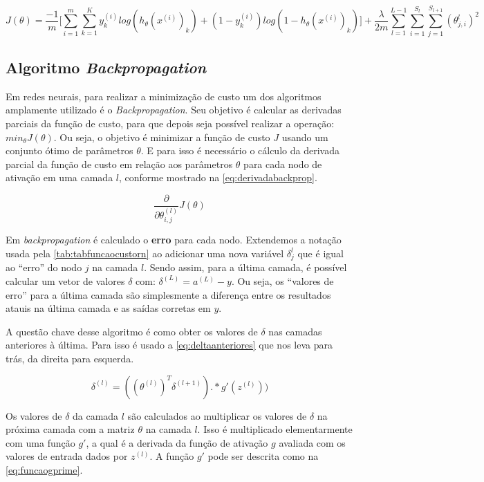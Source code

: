\begin{equation}\label{eq:funcaodecustorn}
J(\theta) = \frac{-1}{m}\Big[ \sum\limits_{i=1}^m \sum\limits_{k=1}^K y_k^{(i)}log(h_{\theta}(x^{(i)})_k) + (1 - y_k^{(i)})log(1 - h_{\theta}(x^{(i)})_k) \Big] +
\frac{\lambda}{2m} 
\sum\limits_{l=1}^{L-1}
\sum\limits_{i=1}^{S_l}
\sum\limits_{j=1}^{S_{l+1}} (\theta_{j,i}^{l})^2
\end{equation}


\subsection{Algoritmo \textit{Backpropagation}}

Em redes neurais, para realizar a minimização de custo um dos algoritmos amplamente utilizado é o \textit{Backpropagation}. Seu objetivo é calcular as derivadas parciais da função de custo, para que depois seja possível realizar a operação: $min_{\theta}J(\theta)$. Ou seja, o objetivo é minimizar a função de custo $J$ usando um conjunto ótimo de parâmetros $\theta$. E para isso é necessário o cálculo da derivada parcial da função de custo em relação aos parâmetros $\theta$ para cada nodo de ativação em uma camada $l$, conforme mostrado na \autoref{eq:derivadabackprop}.

\begin{equation}\label{eq:derivadabackprop}
\frac{\partial}{\partial\theta_{i,j}^{(l)}} J(\theta)
\end{equation}


Em \textit{backpropagation} é calculado o \textbf{erro} para cada nodo. Extendemos a notação usada pela \autoref{tab:tabfuncaocustorn} ao adicionar uma nova variável $\delta_j^{l}$ que é igual ao ``erro'' do nodo $j$ na camada $l$. Sendo assim, para a última camada, é possível calcular um vetor de valores $\delta$ com: $\delta^{(L)} = a^{(L)} - y$. Ou seja, os ``valores de erro'' para a última camada são simplesmente a diferença entre os resultados atauis na última camada e as saídas corretas em $y$.

A questão chave desse algoritmo é como obter os valores de $\delta$ nas camadas anteriores à última. Para isso é usado a \autoref{eq:deltaanteriores} que nos leva para trás, da direita para esquerda.

\begin{equation}\label{eq:deltaanteriores}
\delta^{(l)} = ((\theta^{(l)})^T \delta^{(l+1)}) .* g'(z^{(l)}))
\end{equation}

Os valores de $\delta$ da camada $l$ são calculados ao multiplicar os valores de $\delta$ na próxima camada com a matriz $\theta$ na camada $l$. Isso é multiplicado elementarmente com uma função $g'$, a qual é a derivada da função de ativação $g$ avaliada com os valores de entrada dados por $z^{(l)}$. A função $g'$ pode ser descrita como na \autoref{eq:funcaogprime}.

